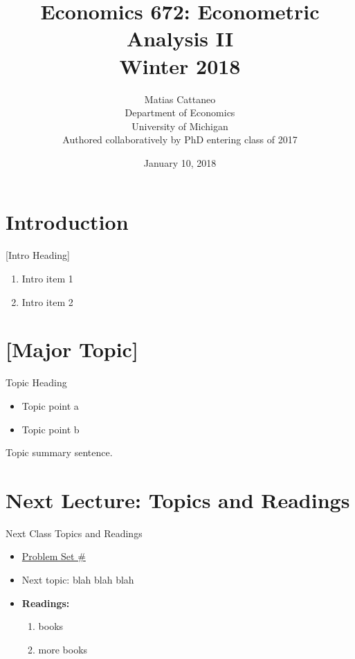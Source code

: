 \documentclass[fleqn, 10pt]{beamer}
\title[Econ-672]{Economics 672: Econometric Analysis II \\ Winter 2018}
\author[M. Cattaneo]{Matias Cattaneo \\
        Department of Economics \\
        University of Michigan \\
        Authored collaboratively by PhD entering class of 2017
        }
\date{January 10, 2018}
\begin{document}


\begin{frame}[plain]
    \titlepage
\end{frame}


\section{Introduction}

\begin{frame}{[Intro Heading]}
    \begin{enumerate}
		\item Intro item 1
		\item Intro item 2
	\end{enumerate}
\end{frame}


\section{[Major Topic]}

\begin{frame}{Topic Heading}

    \begin{itemize}
		\item Topic point a
		\item Topic point b
	\end{itemize}
	Topic summary sentence.
	
\end{frame}


\section{Next Lecture: Topics and Readings}

\begin{frame}{Next Class Topics and Readings}
	
	\begin{itemize}
		\item \underline{Problem Set \#}
		\item Next topic: blah blah blah
		\item \textbf{Readings:}
		\begin{enumerate}
			\item books
			\item more books
		\end{enumerate}
	\end{itemize}
	
\end{frame}
\end{document}
